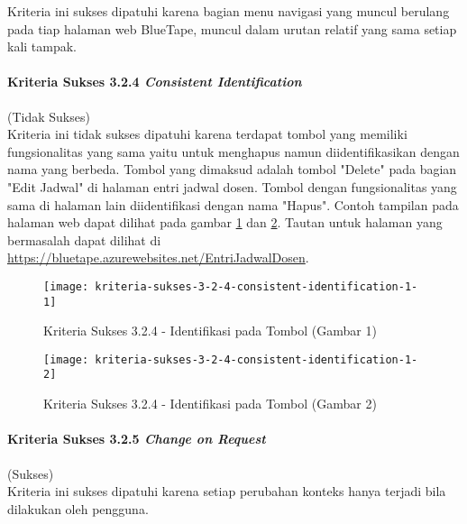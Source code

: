 Kriteria ini sukses dipatuhi karena bagian menu navigasi yang muncul berulang pada tiap halaman web BlueTape, muncul dalam urutan relatif yang sama setiap kali tampak.

\paragraph{Kriteria Sukses 3.2.4 \textit{Consistent Identification}}
\label{par:kepatuhan_bluetape_kriteria_sukses_3.2.4}
(Tidak Sukses)\\

Kriteria ini tidak sukses dipatuhi karena terdapat tombol yang memiliki fungsionalitas yang sama yaitu untuk menghapus namun diidentifikasikan dengan nama yang berbeda. Tombol yang dimaksud adalah tombol "Delete" pada bagian "Edit Jadwal" di halaman entri jadwal dosen. Tombol dengan fungsionalitas yang sama di halaman lain diidentifikasi dengan nama "Hapus". Contoh tampilan pada halaman web dapat dilihat pada gambar \ref{fig:3.2.4_consistent_identification_1} dan \ref{fig:3.2.4_consistent_identification_2}. Tautan untuk halaman yang bermasalah dapat dilihat di \url{https://bluetape.azurewebsites.net/EntriJadwalDosen}.

\begin{figure}[H]
    \centering  
    \texttt{[image: kriteria-sukses-3-2-4-consistent-identification-1-1]}  
    \caption[Kriteria Sukses 3.2.4 - Identifikasi pada Tombol (Gambar 1)]{Kriteria Sukses 3.2.4 - Identifikasi pada Tombol (Gambar 1)}
    \label{fig:3.2.4_consistent_identification_1}  
\end{figure}

\begin{figure}[H]
    \centering  
    \texttt{[image: kriteria-sukses-3-2-4-consistent-identification-1-2]}  
    \caption[Kriteria Sukses 3.2.4 - Identifikasi pada Tombol (Gambar 2)]{Kriteria Sukses 3.2.4 - Identifikasi pada Tombol (Gambar 2)}
    \label{fig:3.2.4_consistent_identification_2}  
\end{figure}

\paragraph{Kriteria Sukses 3.2.5 \textit{Change on Request}}
\label{par:kepatuhan_bluetape_kriteria_sukses_3.2.5}
(Sukses)\\

Kriteria ini sukses dipatuhi karena setiap perubahan konteks hanya terjadi bila dilakukan oleh pengguna.

